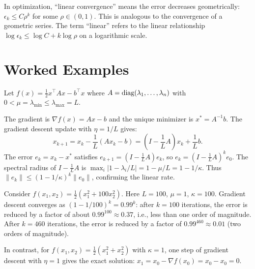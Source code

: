 \documentclass[11pt,a4paper]{article}
\begin{document}
\begin{remark}[Terminology]\label{rem:linear-terminology}
In optimization, ``linear convergence'' means the error decreases
geometrically: $\epsilon_k \le C \rho^k$ for some $\rho \in (0,1)$.
This is analogous to the convergence of a geometric series. The term
``linear'' refers to the linear relationship $\log \epsilon_k \le
\log C + k \log \rho$ on a logarithmic scale.
\end{remark}


\section{Worked Examples}\label{sec:examples}

\begin{example}\label{ex:gd-quadratic}
Let $f(x) = \frac{1}{2}x^\top A x - b^\top x$ where
$A = \operatorname{diag}(\lambda_1, \dots, \lambda_n)$ with
$0 < \mu = \lambda_{\min} \le \lambda_{\max} = L$.

The gradient is $\nabla f(x) = Ax - b$ and the unique minimizer is
$x^* = A^{-1}b$. The gradient descent update with $\eta = 1/L$ gives:
\[
  x_{k+1} = x_k - \frac{1}{L}(Ax_k - b) = (I - \frac{1}{L}A)x_k
  + \frac{1}{L}b.
\]
The error $e_k = x_k - x^*$ satisfies $e_{k+1} = (I - \frac{1}{L}A)e_k$,
so $e_k = (I - \frac{1}{L}A)^k e_0$. The spectral radius of
$I - \frac{1}{L}A$ is $\max_i |1 - \lambda_i/L| = 1 - \mu/L = 1 - 1/\kappa$.
Thus $\|e_k\| \le (1 - 1/\kappa)^k \|e_0\|$, confirming the linear rate.
\end{example}

\begin{example}\label{ex:condition-number}
Consider $f(x_1, x_2) = \frac{1}{2}(x_1^2 + 100 x_2^2)$. Here
$L = 100$, $\mu = 1$, $\kappa = 100$. Gradient descent converges as
$(1 - 1/100)^k = 0.99^k$: after $k = 100$ iterations, the error is
reduced by a factor of about $0.99^{100} \approx 0.37$, i.e., less than
one order of magnitude. After $k = 460$ iterations, the error is reduced
by a factor of $0.99^{460} \approx 0.01$ (two orders of magnitude).

In contrast, for $f(x_1, x_2) = \frac{1}{2}(x_1^2 + x_2^2)$ with
$\kappa = 1$, one step of gradient descent with $\eta = 1$ gives the exact
solution: $x_1 = x_0 - \nabla f(x_0) = x_0 - x_0 = 0$.
\end{example}
\end{document}
